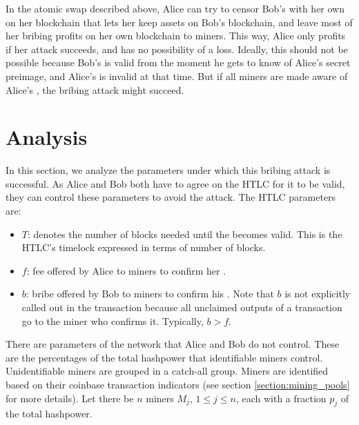 In the atomic swap described above, Alice can try to censor Bob's \sellertxn{} with her own \bribetxn{} on her blockchain that lets her keep assets on Bob's blockchain, and leave most of her bribing profits on her own blockchain to miners. This way, Alice only profits if her attack succeeds, and has no possibility of a loss. Ideally, this should not be possible because Bob's \sellertxn{} is valid from the moment he gets to know of Alice's secret preimage, and Alice's \bribetxn{} is invalid at that time. But if all miners are made aware of Alice's \bribetxn{}, the bribing attack might succeed.

\section{Analysis}
In this section, we analyze the parameters under which this bribing attack is successful. As Alice and Bob both have to agree on the HTLC for it to be valid, they can control these parameters to avoid the attack. The HTLC parameters are:
\begin{itemize}
    \item $T$: denotes the number of blocks needed until the \bribetxn{} becomes valid. This is the HTLC's timelock expressed in terms of number of blocks.
    \item $f$: fee offered by Alice to miners to confirm her \sellertxn{}.
    \item $b$: bribe offered by Bob to miners to confirm his \bribetxn{}. Note that $b$ is not explicitly called out in the transaction because all unclaimed outputs of a transaction go to the miner who confirms it. Typically, $b > f$.
\end{itemize}
There are parameters of the network that Alice and Bob do not control. These are the percentages of the total hashpower that identifiable miners control. Unidentifiable miners are grouped in a catch-all group. Miners are identified based on their coinbase transaction indicators (see section \ref{section:mining_pools} for more details). Let there be $n$ miners $M_j$, $1\leq j \leq n$, each with a fraction $p_j$ of the total hashpower.

